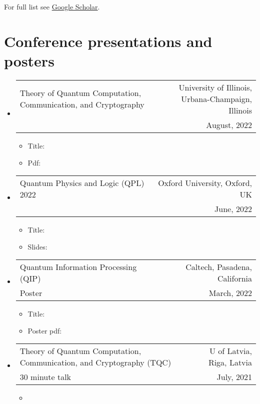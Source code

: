 \documentclass[letterpaper,11pt]{article}
\makeatletter
\newcommand{\ConferenceItem}[4]{
	\item{\vspace{-1pt}
		\begin{tabular*}{0.97\textwidth}{l@{\extracolsep{\fill}}r}
			{#1} & {#2}\\
			{#3} & {#4}
		\end{tabular*}
		\vspace{-5pt}
	}
}
\makeatother
\begin{document}
\nocite{ZurelHeimendahl2022,RaussendorfFeldmann2022,OkayRaussendorf2021,Zurel2020,ZurelRaussendorf2020,RaussendorfZurel2020}
\printbibliography[title={Publications \& preprints}]
For full list see \href{https://scholar.google.com/citations?user=qUA_szUAAAAJ&hl=en&oi=ao}{Google Scholar}.

\section*{Conference presentations and posters}
\begin{itemize}[leftmargin=*]
	\ConferenceItem{Theory of Quantum Computation, Communication, and Cryptography}{University of Illinois, Urbana-Champaign, Illinois}{}{August, 2022}
	\begin{itemize}
		\item Title: 
		\item Pdf: 
	\end{itemize}
	
	\ConferenceItem{Quantum Physics and Logic (QPL) 2022}{Oxford University, Oxford, UK}{}{June, 2022}
	\begin{itemize}
		\item Title: 
		\item Slides:
	\end{itemize}
	
	\ConferenceItem{Quantum Information Processing (QIP)}{Caltech, Pasadena, California}{Poster}{March, 2022}
	\begin{itemize}
		\item Title: 
		\item Poster pdf: 
	\end{itemize}
	\ConferenceItem{Theory of Quantum Computation, Communication, and Cryptography (TQC)}{U of Latvia, Riga, Latvia}{30 minute talk}{July, 2021}
	\begin{itemize}
			\item 
		\else
		

\end{itemize}
\end{itemize}
\end{document}
